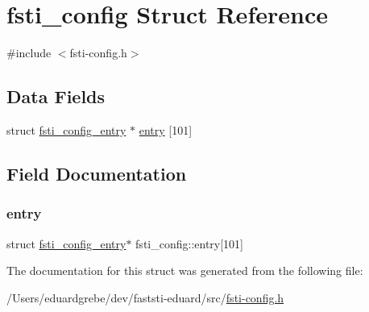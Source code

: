 \hypertarget{structfsti__config}{}\section{fsti\+\_\+config Struct Reference}
\label{structfsti__config}


{\ttfamily \#include $<$fsti-\/config.\+h$>$}

\subsection*{Data Fields}
\begin{DoxyCompactItemize}
\item 
struct \mbox{\hyperlink{structfsti__config__entry}{fsti\+\_\+config\+\_\+entry}} $\ast$ \mbox{\hyperlink{structfsti__config_a40fb82d864e3f7f8feaf9501d966ed28}{entry}} \mbox{[}101\mbox{]}
\end{DoxyCompactItemize}


\subsection{Field Documentation}
\mbox{\label{structfsti__config_a40fb82d864e3f7f8feaf9501d966ed28}} 
\subsubsection{\texorpdfstring{entry}{entry}}
{\footnotesize\ttfamily struct \mbox{\hyperlink{structfsti__config__entry}{fsti\+\_\+config\+\_\+entry}}$\ast$ fsti\+\_\+config\+::entry\mbox{[}101\mbox{]}}



The documentation for this struct was generated from the following file\+:\begin{DoxyCompactItemize}
\item 
/\+Users/eduardgrebe/dev/faststi-\/eduard/src/\mbox{\hyperlink{fsti-config_8h}{fsti-\/config.\+h}}\end{DoxyCompactItemize}
